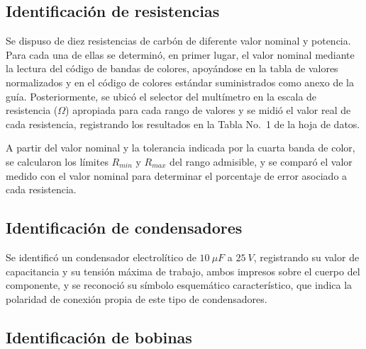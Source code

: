 \subsection{Identificación de resistencias}

Se dispuso de diez resistencias de carbón de diferente valor nominal y potencia. Para cada una de ellas se determinó, en primer lugar, el valor nominal mediante la lectura del código de bandas de colores, apoyándose en la tabla de valores normalizados y en el código de colores estándar suministrados como anexo de la guía. Posteriormente, se ubicó el selector del multímetro en la escala de resistencia ($\Omega$) apropiada para cada rango de valores y se midió el valor real de cada resistencia, registrando los resultados en la Tabla No.~1 de la hoja de datos.

A partir del valor nominal y la tolerancia indicada por la cuarta banda de color, se calcularon los límites $R_{min}$ y $R_{max}$ del rango admisible, y se comparó el valor medido con el valor nominal para determinar el porcentaje de error asociado a cada resistencia.


\subsection{Identificación de condensadores}

Se identificó un condensador electrolítico de $10~\mu F$ a $25~V$, registrando su valor de capacitancia y su tensión máxima de trabajo, ambos impresos sobre el cuerpo del componente, y se reconoció su símbolo esquemático característico, que indica la polaridad de conexión propia de este tipo de condensadores.


\subsection{Identificación de bobinas}

